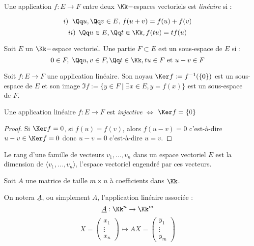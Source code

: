 \documentclass[class=report,crop=false]{standalone}
\begin{document}
\begin{definition}
Une application $f : E \to F$ entre deux $\Kk-$espaces vectoriels est {\it linéaire} si :

\[i)\;\; \Qq u,\Qq v \in E, \, f(u+v) = f(u) +f(v) \]
\[ii)\;\, \Qq u \in E,\Qq t \in \Kk, f(tu) = tf(u)\]
\end{definition}


\begin{definition}
Soit $E$ un $\Kk-$espace vectoriel. Une partie $F \subset E$ est un sous-espace de $E$ si :
\[0 \in F, \; \Qq u,v \in F, \Qq t\in \Kk, tu \in F \text{ et } u+v \in F\] 
\end{definition}

\begin{exemple}
Soit $f : E \to F$ une application linéaire. Son noyau $\Ker f := f^{-1}(\{0\})$ est un sous-espace de $E$ et son image $\Im f := \{y \in F \mid \exists x \in E, y=f(x)\}$ est un sous-espace de $F$.
\end{exemple}

\begin{proposition}
Une application linéaire $f : E \to F$ est {\it injective} $\iff$ $\Ker f = \{0\}$ 
\end{proposition}

\begin{proof}
Si $\Ker f = 0$, si $f(u) = f(v)$, alors $f(u-v)=0$ c'est-à-dire $u-v \in \Ker f = 0 $ donc $u-v=0$ c'est-à-dire $u=v$. 
\end{proof}

\begin{definition}
Le rang d'une famille de vecteurs $v_1,...,v_n$ dans un espace vectoriel $E$ est la dimension de $\langle v_1,...,v_n \rangle$, l'espace vectoriel engendré par ces vecteurs.
\end{definition}


Soit $A$ une matrice de taille $m \times n$ à coefficients dans $\Kk$. 

On notera $\underline{A}$, ou simplement $A$, l'application linéaire associée :
\[\underline{A} : \Kk^n \to \Kk^m\]
\[X=\left(\begin{array}{c}
x_1\\
\vdots\\
x_n
\end{array}\right) \mapsto AX= \left(\begin{array}{c}
y_1\\
\vdots\\
y_m
\end{array}\right)\]
\end{document}

